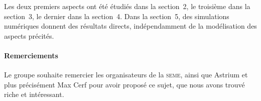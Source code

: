 Les deux premiers aspects ont été étudiés dans la section~2, le troisième dans la section~3, le dernier dans la section~4. Dans la section~5, des simulations numériques donnent des résultats directs, indépendamment de la modélisation des aspects précités.
\paragraph*{Remerciements}

Le groupe souhaite remercier les organisateurs de la \textsc{seme}, ainsi que Astrium et plus précisément Max
Cerf pour avoir proposé ce sujet, que nous avons trouvé riche et intéressant.
